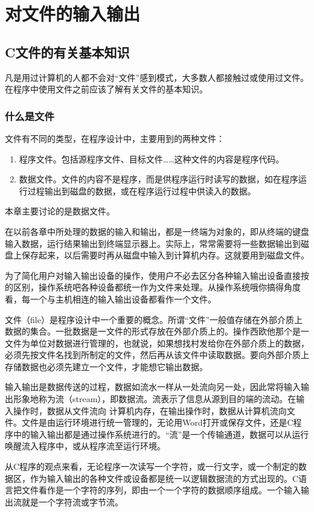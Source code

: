 \chapter{对文件的输入输出}
\section{C文件的有关基本知识}
凡是用过计算机的人都不会对“文件”感到模式，大多数人都接触过或使用过文件。在程序中使用文件之前应该了解有关文件的基本知识。
\subsection{什么是文件}
文件有不同的类型，在程序设计中，主要用到的两种文件：
\begin{enumerate}
	\item 程序文件。包括源程序文件、目标文件……这种文件的内容是程序代码。
	\item 数据文件。文件的内容不是程序，而是供程序运行时读写的数据，如在程序运行过程输出到磁盘的数据，或在程序运行过程中供读入的数据。
\end{enumerate}
本章主要讨论的是数据文件。

在以前各章中所处理的数据的输入和输出，都是一终端为对象的，即从终端的键盘输入数据，运行结果输出到终端显示器上。实际上，常常需要将一些数据输出到磁盘上保存起来，以后需要时再从磁盘中输入到计算机内存。这就要用到磁盘文件。

为了简化用户对输入输出设备的操作，使用户不必去区分各种输入输出设备直接按的区别，操作系统吧各种设备都统一作为文件来处理。从操作系统哦你搞得角度看，每一个与主机相连的输入输出设备都看作一个文件。

文件（file）是程序设计中一个重要的概念。所谓“文件”一般值存储在外部介质上数据的集合。一批数据是一文件的形式存放在外部介质上的。操作西欧他那个是一文件为单位对数据进行管理的，也就说，如果想找村发给你在外部介质上的数据，必须先按文件名找到所制定的文件，然后再从该文件中读取数据。要向外部介质上存储数据也必须先建立一个文件，才能想它输出数据。

输入输出是数据传送的过程，数据如流水一样从一处流向另一处，因此常将输入输出形象地称为流（stream），即数据流。流表示了信息从源到目的端的流动。在输入操作时，数据从文件流向 计算机内存，在输出操作时，数据从计算机流向文件。文件是由运行环境进行统一管理的，无论用Word打开或保存文件，还是C程序中的输入输出都是通过操作系统进行的。“流”是一个传输通道，数据可以从运行唤醒流入程序中，或从程序流至运行环境。

从C程序的观点来看，无论程序一次读写一个字符，或一行文字，或一个制定的数据区，作为输入输出的各种文件或设备都是统一以逻辑数据流的方式出现的。C语言把文件看作是一个字符的序列，即由一个一个字符的数据顺序组成。一个输入输出流就是一个字符流或字节流。

